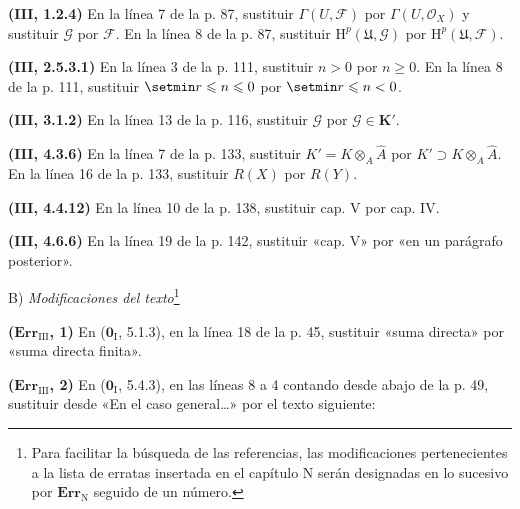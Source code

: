 \documentclass[10pt,oneside,openany]{book}
\theoremstyle{egaenv}\newtheorem*{env}{---}
\theoremstyle{egastatement}
\theoremstyle{egadescription}
\renewcommand{\leq}{\leqslant}
\renewcommand{\geq}{\geqslant}
\begin{document}
\noindent\textbf{(III, 1.2.4)} En la línea 7 de la p. 87, sustituir
$\Gamma(U,\mathscr F)$ por $\Gamma(U,\mathscr O_X)$ y sustituir $\mathscr G$
por $\mathscr F$. En la línea 8 de la p. 87, sustituir
$\mathrm H^p(\mathfrak U,\mathscr G)$ por $\mathrm H^p(\mathfrak U,\mathscr F)$.

\noindent\textbf{(III, 2.5.3.1)} En la línea 3 de la p. 111, sustituir $n>0$
por $n\geq0$. En la línea 8 de la p. 111, sustituir $\setmin r\leq n\leq0$ por
$\setmin r\leq n<0$.

\noindent\textbf{(III, 3.1.2)} En la línea 13 de la p. 116, sustituir
$\mathscr G$ por $\mathscr G\in\boldsymbol{K}'$.

\noindent\textbf{(III, 4.3.6)} En la línea 7 de la p. 133, sustituir
$K'=K\otimes_A\widehat A$ por $K'\supset K\otimes_A\widehat A$. En la línea 16
de la p. 133, sustituir $R(X)$ por $R(Y)$.

\noindent\textbf{(III, 4.4.12)} En la línea 10 de la p. 138, sustituir cap. V
por cap. IV.

\noindent\textbf{(III, 4.6.6)} En la línea 19 de la p. 142, sustituir «cap. V»
por «en un parágrafo posterior».

\begin{center}
B) \emph{Modificaciones del texto}\footnote{Para facilitar la búsqueda de las
referencias, las modificaciones pertenecientes a la lista de erratas insertada
en el capítulo N serán designadas en lo sucesivo por $\mathbf{Err}_{\mathrm N}$
seguido de un número.}
\end{center}

\noindent\textbf{($\mathbf{Err}_{\mathrm{III}}$, 1)} En
($\mathbf{0}_{\mathrm I}$, 5.1.3), en la línea 18 de la p. 45, sustituir «suma directa»
por «suma directa finita».

\noindent\textbf{($\mathbf{Err}_{\mathrm{III}}$, 2)} En
($\mathbf{0}_{\mathrm I}$, 5.4.3), en las líneas 8 a 4 contando desde abajo de la p. 49,
sustituir desde «En el caso general\ldots{}» por el texto siguiente:
\end{document}
